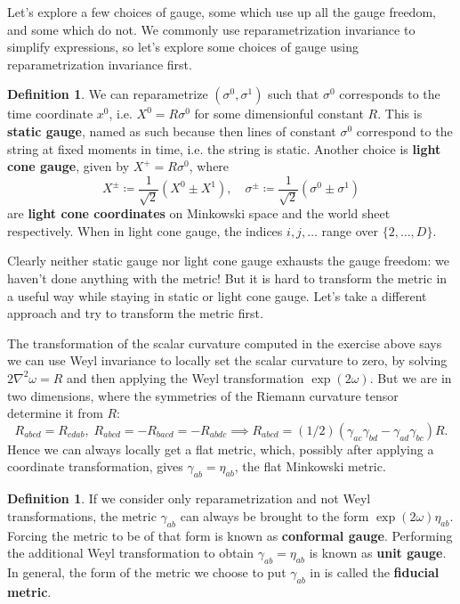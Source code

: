 \documentclass{report}
\theoremstyle{plain}
\theoremstyle{definition}
\newtheorem{definition}[theorem]{Definition}
\theoremstyle{remark}
\begin{document}
Let's explore a few choices of gauge, some which use up all the gauge
freedom, and some which do not. We commonly use reparametrization
invariance to simplify expressions, so let's explore some choices of
gauge using reparametrization invariance first.

\begin{definition}
  We can reparametrize $(\sigma^0, \sigma^1)$ such that $\sigma^0$
  corresponds to the time coordinate $x^0$, i.e. $X^0 = R\sigma^0$ for
  some dimensionful constant $R$. This is {\bf static gauge}, named as
  such because then lines of constant $\sigma^0$ correspond to the
  string at fixed moments in time, i.e. the string is static. Another
  choice is {\bf light cone gauge}, given by $X^+ = R\sigma^0$, where
  \[ X^\pm \coloneqq \frac{1}{\sqrt{2}}(X^0 \pm X^1), \quad \sigma^\pm \coloneqq \frac{1}{\sqrt{2}}(\sigma^0 \pm \sigma^1) \]
  are {\bf light cone coordinates} on Minkowski space and the world
  sheet respectively. When in light cone gauge, the indices $i, j,
  \ldots$ range over $\{2, \ldots, D\}$.
\end{definition}

Clearly neither static gauge nor light cone gauge exhausts the gauge
freedom: we haven't done anything with the metric! But it is hard to
transform the metric in a useful way while staying in static or
light cone gauge. Let's take a different approach and try to transform
the metric first.

The transformation of the scalar curvature computed in the exercise
above says we can use Weyl invariance to locally set the scalar
curvature to zero, by solving $2\nabla^2\omega = R$ and then applying
the Weyl transformation $\exp(2\omega)$. But we are in two dimensions,
where the symmetries of the Riemann curvature tensor determine it from
$R$:
\[ R_{abcd} = R_{cdab}, \; R_{abcd} = -R_{bacd} = -R_{abdc} \implies R_{abcd} = (1/2)(\gamma_{ac}\gamma_{bd} - \gamma_{ad}\gamma_{bc}) R. \]
Hence we can always locally get a flat metric, which, possibly after
applying a coordinate transformation, gives $\gamma_{ab} = \eta_{ab}$,
the flat Minkowski metric.

\begin{definition}
  If we consider only reparametrization and not Weyl transformations,
  the metric $\gamma_{ab}$ can always be brought to the form
  $\exp(2\omega)\eta_{ab}$. Forcing the metric to be of that form is
  known as {\bf conformal gauge}. Performing the additional Weyl
  transformation to obtain $\gamma_{ab} = \eta_{ab}$ is known as {\bf
    unit gauge}. In general, the form of the metric we choose to put
  $\gamma_{ab}$ in is called the {\bf fiducial metric}.
\end{definition}
\end{document}

